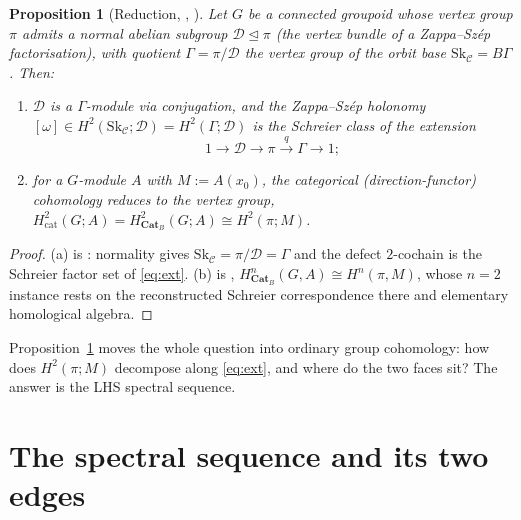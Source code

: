 \documentclass[11pt]{article}
\newtheorem{proposition}[theorem]{Proposition}
\theoremstyle{definition}
\newcommand{\Sk}{\mathrm{Sk}}
\newcommand{\C}{\mathcal{C}}
\newcommand{\D}{\mathcal{D}}
\newcommand{\CatB}{\mathbf{Cat}_B}
\begin{document}
\begin{proposition}[Reduction, {\cite[Prop.~2.1--2.2]{gzs}}, {\cite[T1]{sep2}}]
\label{prop:reduce}
Let $G$ be a connected groupoid whose vertex group $\pi$ admits a normal abelian subgroup
$\D\trianglelefteq\pi$ (the vertex bundle of a Zappa--Sz\'ep factorisation), with quotient
$\Gamma=\pi/\D$ the vertex group of the orbit base $\Sk_\C=B\Gamma$. Then:
\begin{enumerate}
\item[\textup{(a)}] $\D$ is a $\Gamma$-module via conjugation, and the Zappa--Sz\'ep holonomy
$[\omega]\in H^2(\Sk_\C;\D)=H^2(\Gamma;\D)$ is the Schreier class of the extension
\begin{equation}\label{eq:ext}
   1\longrightarrow\D\longrightarrow\pi\xrightarrow{\ q\ }\Gamma\longrightarrow1;
\end{equation}
\item[\textup{(b)}] for a $G$-module $A$ with $M:=A(x_0)$, the categorical
(direction-functor) cohomology reduces to the vertex group,
$H^2_{\mathrm{cat}}(G;A)=H^2_{\CatB}(G;A)\cong H^2(\pi;M)$.
\end{enumerate}
\end{proposition}
\begin{proof}
(a) is \cite[Prop.~2.1--2.2]{gzs}: normality gives $\Sk_\C=\pi/\D=\Gamma$ and the defect
$2$-cochain is the Schreier factor set of \eqref{eq:ext}. (b) is \cite[T1]{sep2},
$H^n_{\CatB}(G,A)\cong H^n(\pi,M)$, whose $n=2$ instance rests on the reconstructed Schreier
correspondence there and elementary homological algebra.
\end{proof}

Proposition~\ref{prop:reduce} moves the whole question into ordinary group cohomology: how
does $H^2(\pi;M)$ decompose along \eqref{eq:ext}, and where do the two faces sit? The answer
is the LHS spectral sequence.

\section{The spectral sequence and its two edges}\label{sec:lhs}
\end{document}
